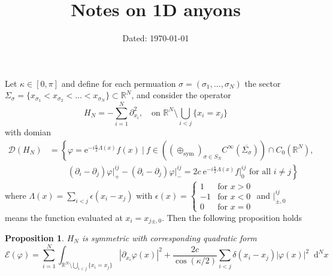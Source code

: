 \documentclass[a4paper,11pt]{article}
\author{}
\date{Dated: \today}
\title{Notes on 1D anyons}
\newcommand{\euler}[1]{\text{e}^{#1}}
\newcommand{\abs}[1]{\left\lvert #1 \right\rvert}
\newcommand*\diff{\mathop{}\!\mathrm{d}}
\newcommand{\R}{\mathbb{R}}
\newtheorem{proposition}{Proposition}
\numberwithin{equation}{section}
\begin{document}
	\maketitle
	Let $ \kappa\in[0,\pi] $ and define for each permuation $ \sigma=(\sigma_1,...,\sigma_N) $ the sector $ \Sigma_\sigma=\{x_{\sigma_1}<x_{\sigma_2}<...<x_{\sigma_N}\}\subset \R^N $, and consider the operator\begin{equation}
	H_N=-\sum_{i=1}^{N}\partial_{x_i}^2,\quad\text{on }\R^N\setminus\bigcup_{i<j}\{x_i=x_j\}
	\end{equation}
	with domian \begin{equation}
	\begin{aligned}
	\mathcal{D}(H_N)&=\left\{\varphi=\euler{-i\frac{\kappa}{2}\Lambda(x)}f(x)\ \Bigg\vert\ f\in \left((\oplus_{\text{sym}})_{\sigma\in S_N } C^\infty(\overline{\Sigma_{\sigma}})\right)\cap C_0(\R^N) ,\right.\\&\qquad \left.\ (\partial_i-\partial_j)\varphi\rvert^{ij}_+-(\partial_i-\partial_j)\varphi\rvert^{ij}_-=2c\ \euler{-i\frac{\kappa}{2}\Lambda(x)} f\rvert^{ij}_0 \text{ for all }i\neq j \right\}
	\end{aligned}
	\end{equation}
	where $ \Lambda(x)= \sum_{i<j}\epsilon(x_i-x_j) $  with $ \epsilon(x)=\begin{cases}
	1&\text{for }x>0\\
	-1&\text{for }x<0\\
	0&\text{for }x=0
	\end{cases} $ and $ \vert^{ij}_{\pm,0} $ means the function evaluated at $ x_i=x_{j \pm,0} $. Then the following proposition holds \begin{proposition}
		$ H_N $ is symmetric with corresponding quadratic form \begin{equation}
		\mathcal{E}(\varphi)=\sum_{i=1}^{N}\int_{{\R^N\setminus\bigcup_{i<j}\{x_i=x_j\}}} \abs{\partial_{x_i}\varphi(x)}^2+\frac{2c}{\cos(\kappa/2)}\sum_{i<j} \delta(x_i-x_j)\abs{\varphi(x)}^2\diff^{N}x
		\end{equation}
	\end{proposition}
\end{document}
